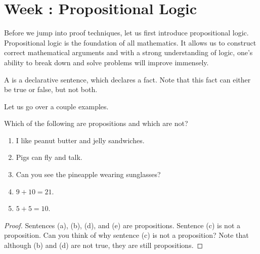 \documentclass[../notes.tex]{subfiles}
\begin{document}
\section{Week \theweek: Propositional Logic}
Before we jump into proof techniques, let us first introduce propositional logic. Propositional logic is the foundation of all mathematics. It allows us to construct correct mathematical arguments and with a strong understanding of logic, one's ability to break down and solve problems will improve immensely. 
\begin{definition}[proposition]
    A  is a declarative sentence, which declares a fact. Note that this fact can either be true or false, but not both. 
\end{definition}
Let us go over a couple examples. 
\begin{example}
    Which of the following are propositions and which are not? 
    \begin{enumerate}[label=(\alph*)]
        \item I like peanut butter and jelly sandwiches. 
        \item Pigs can fly and talk.
        \item Can you see the pineapple wearing sunglasses?
        \item $9 + 10 = 21$.
        \item $5 + 5 = 10$.
    \end{enumerate}
\end{example}
\begin{proof}
    Sentences (a), (b), (d), and (e) are propositions. Sentence (c) is not a proposition. Can you think of why sentence (c) is not a proposition? Note that although (b) and (d) are not true, they are still propositions.
\end{proof}
\end{document}

